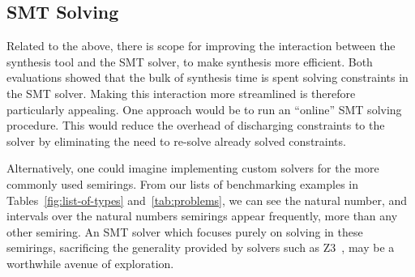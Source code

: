 \subsection{SMT Solving}
Related to the above, there is scope for improving the interaction between the
synthesis tool and the SMT solver, to make synthesis more efficient. Both
evaluations showed that the bulk of synthesis time is spent solving constraints
in the SMT solver. Making this interaction more streamlined is therefore
particularly appealing. One approach would be to run an ``online'' SMT solving
procedure. This would reduce the overhead of discharging constraints to the
solver by eliminating the need to re-solve already solved constraints. 

Alternatively, one could imagine implementing custom solvers for the more
commonly used semirings. From our lists of benchmarking examples in
Tables~\ref{fig:list-of-types} and~\ref{tab:problems}, we can see the natural
number, and intervals over the natural numbers semirings appear frequently, more
than any other semiring. An SMT solver which focuses purely on solving in these
semirings, sacrificing the generality provided by solvers such as Z3~\citep{z3},
may be a worthwhile avenue of exploration. 


